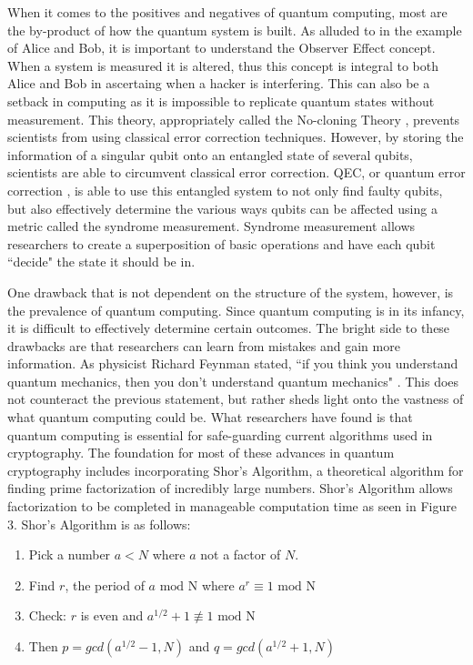 \documentclass[12pt]{article}
\begin{document}
When it comes to the positives and negatives of quantum computing, most are the by-product of how the quantum system is built. As alluded to in the example of Alice and Bob, it is important to understand the Observer Effect concept. When a system is measured it is altered, thus this concept is integral to both Alice and Bob in ascertaing when a hacker is interfering. This can also be a setback in computing as it is impossible to replicate quantum states without measurement. This theory, appropriately called the No-cloning Theory \cite{quantumdef}, prevents scientists from using classical error correction techniques. However, by storing the information of a singular qubit onto an entangled state of several qubits, scientists are able to circumvent classical error correction. QEC, or quantum error correction \cite{quantumerror}, is able to use this entangled system to not only find faulty qubits, but also effectively determine the various ways qubits can be affected using a metric called the syndrome measurement. Syndrome measurement allows researchers to create a superposition of basic operations and have each qubit ``decide"\cite{quantumerror} the state it should be in. 
\par\vspace{1mm}
One drawback that is not dependent on the structure of the system, however, is the prevalence of quantum computing. Since quantum computing is in its infancy, it is difficult to effectively determine certain outcomes. The bright side to these drawbacks are that researchers can learn from mistakes and gain more information. As physicist Richard Feynman stated, ``if you think you understand quantum mechanics, then you don't understand quantum mechanics" \cite{feynman}. This does not counteract the previous statement, but rather sheds light onto the vastness of what quantum computing could be. What researchers have found is that quantum computing is essential for safe-guarding current algorithms used in cryptography.  The foundation for most of these advances in quantum cryptography includes incorporating Shor's Algorithm, a theoretical algorithm for finding prime factorization of incredibly large numbers. Shor's Algorithm \cite{shor} allows factorization to be completed in manageable computation time as seen in Figure 3. Shor's Algorithm is as follows:
\begin{enumerate}
    \item Pick a number $a < N$ where $a$ not a factor of $N$.
    \item Find $r$, the period of $a\text{ mod N}$ where $a^r \equiv 1\text{ mod N}$
    \item Check: $r$ is even and $a^{1/2}+1 \not \equiv 1 \text{ mod N}$
    \item Then $p=gcd(a^{1/2}-1, N)$ and $q=gcd(a^{1/2}+1, N)$
\end{enumerate}
\end{document}
